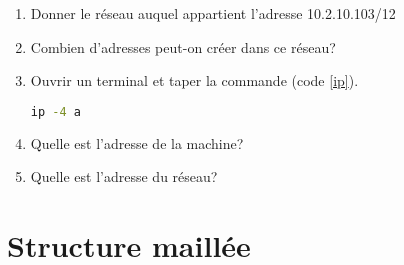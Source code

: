 \documentclass[a4paper,11pt]{article}
\begin{document}
\begin{activite}
    \begin{enumerate}
        \item Donner le réseau auquel appartient l'adresse 10.2.10.103/12
        \item Combien d'adresses peut-on créer dans ce réseau?
        \item Ouvrir un terminal et taper la commande (code \ref{ip}).
        \begin{center}
            \begin{lstlisting}[language=bash]
ip -4 a
            \end{lstlisting}
            \label{ip}
        \end{center}

        \item Quelle est l'adresse de la machine?
        \item Quelle est l'adresse du réseau?
    \end{enumerate}
\end{activite}
\section{Structure maillée}
\end{document}
